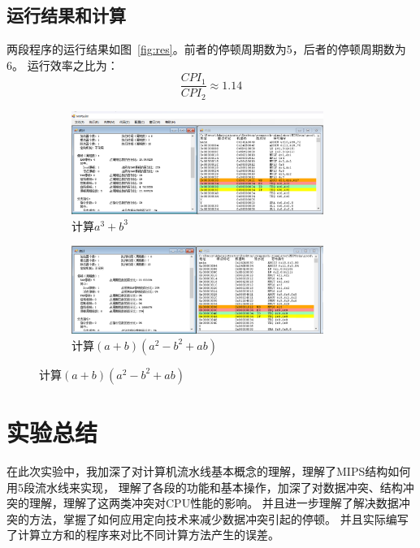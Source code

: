 \documentclass[a4paper,twoside]{article}
\begin{document}
\begin{spacing}{1.2}
\subsection{运行结果和计算}

两段程序的运行结果如图~\ref*{fig:res}。前者的停顿周期数为5，后者的停顿周期数为6。
运行效率之比为：
\begin{equation}
	\frac{CPI_1}{CPI_2}\approx1.14
\end{equation}

\begin{figure}[H]
	\centering
	\caption{计算$a^3+b^3$和$(a+b)(a^2-b^2+ab)$的运行结果}
	\label{fig:res}
	\begin{subfigure}[b]{0.4\textwidth}
		\centering
		\includegraphics[width=0.9\textwidth]{images/mul.png}
		\caption{计算$a^3+b^3$}
	\end{subfigure}
	\begin{subfigure}[b]{0.4\textwidth}
		\centering
		\includegraphics[width=0.9\textwidth]{images/mul2.png}
		\caption{计算$(a+b)(a^2-b^2+ab)$}
	\end{subfigure}
\end{figure}


\clearpage

\section{实验总结}

在此次实验中，我加深了对计算机流水线基本概念的理解，理解了MIPS结构如何用5段流水线来实现，
理解了各段的功能和基本操作，加深了对数据冲突、结构冲突的理解，理解了这两类冲突对CPU性能的影响。
并且进一步理解了解决数据冲突的方法，掌握了如何应用定向技术来减少数据冲突引起的停顿。
并且实际编写了计算立方和的程序来对比不同计算方法产生的误差。

\end{spacing}
\end{document}
